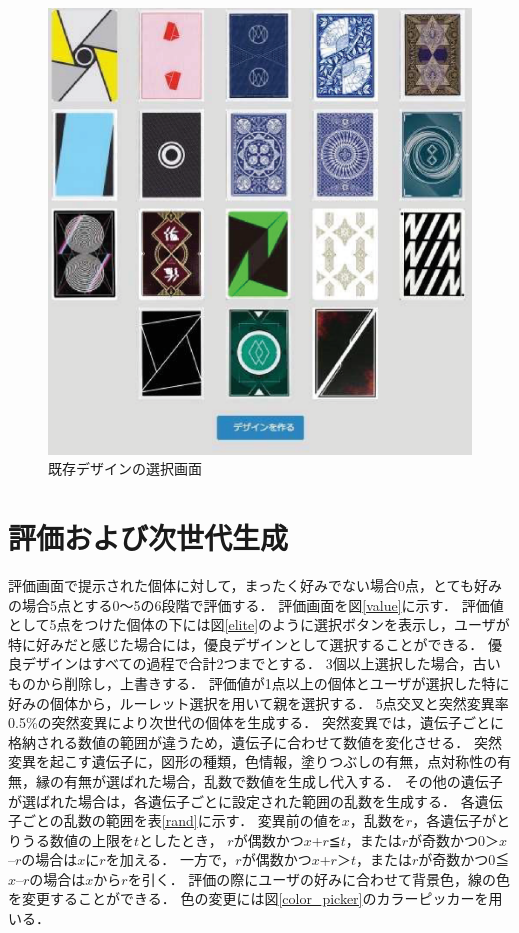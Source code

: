 \begin{figure}[t]
    \begin{center}
        \centering
        \includegraphics[scale=0.8]{image/index.eps}
        \caption{既存デザインの選択画面}
        \label{index}
    \end{center}
\end{figure}

\section{評価および次世代生成}
評価画面で提示された個体に対して，まったく好みでない場合0点，とても好みの場合5点とする0～5の6段階で評価する．
評価画面を図\ref{value}に示す．
評価値として5点をつけた個体の下には図\ref{elite}のように選択ボタンを表示し，ユーザが特に好みだと感じた場合には，優良デザインとして選択することができる．
優良デザインはすべての過程で合計2つまでとする．
3個以上選択した場合，古いものから削除し，上書きする．
評価値が1点以上の個体とユーザが選択した特に好みの個体から，ルーレット選択を用いて親を選択する．
5点交叉と突然変異率0.5\%の突然変異により次世代の個体を生成する．
突然変異では，遺伝子ごとに格納される数値の範囲が違うため，遺伝子に合わせて数値を変化させる．
突然変異を起こす遺伝子に，図形の種類，色情報，塗りつぶしの有無，点対称性の有無，縁の有無が選ばれた場合，乱数で数値を生成し代入する．
その他の遺伝子が選ばれた場合は，各遺伝子ごとに設定された範囲の乱数を生成する．
各遺伝子ごとの乱数の範囲を表\ref{rand}に示す．
変異前の値を$x$，乱数を$r$，各遺伝子がとりうる数値の上限を$t$としたとき，
$r$が偶数かつ$x$+$r$≦$t$，または$r$が奇数かつ0＞$x$–$r$の場合は$x$に$r$を加える．
一方で，$r$が偶数かつ$x$+$r$＞$t$，または$r$が奇数かつ0≦$x$–$r$の場合は$x$から$r$を引く．
評価の際にユーザの好みに合わせて背景色，線の色を変更することができる．
色の変更には図\ref{color_picker}のカラーピッカーを用いる．
\label{0404}

